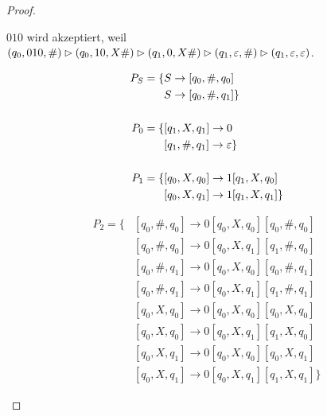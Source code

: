 \begin{proof}
\begin{center}
    \end{center}
    
    $010$ wird akzeptiert, weil
        $(q_0, 010, \#)\rhd (q_0, 10, X\#)\rhd (q_1, 0, X\#)\rhd (q_1, \varepsilon, \#)\rhd (q_1, \varepsilon, \varepsilon)$.
    
    \begin{center}
    \vspace*{-1.5\baselineskip}
    \begin{minipage}[t]{55mm}
    \begin{align*}
    P_S = \{ 
    & S \to [q_0, \#, q_0]\\
    & S \to [q_0, \#, q_1] 
    \}\\
    \\
    P_0 = \{ 
    & [q_1, X, q_1] \to 0\\
    & [q_1, \#, q_1] \to \varepsilon
    \}\\
    \\
    P_1 = \{ 
    & [q_0, X, q_0] \to 1[q_1, X, q_0]\\
    & [q_0, X, q_1] \to 1[q_1, X, q_1]
    \}
    \end{align*}
    \end{minipage}
    \begin{minipage}[t]{70mm}
    \begin{align*}
    P_2 = \{ 
    & [q_0, \#,q_0] \to 0[q_0, X, q_0] [q_0, \#, q_0]\\
    & [q_0, \#,q_0] \to 0[q_0, X, q_1] [q_1, \#, q_0]\\
    & [q_0, \#,q_1] \to 0[q_0, X, q_0] [q_0, \#, q_1]\\
    & [q_0, \#,q_1] \to 0[q_0, X, q_1] [q_1, \#, q_1]\\
    & [q_0, X,q_0] \to 0[q_0, X, q_0] [q_0, X, q_0]\\
    & [q_0, X,q_0] \to 0[q_0, X, q_1] [q_1, X, q_0]\\
    & [q_0, X,q_1] \to 0[q_0, X, q_0] [q_0, X, q_1]\\
    & [q_0, X,q_1] \to 0[q_0, X, q_1] [q_1, X, q_1]
    \}
    \end{align*}
    \end{minipage}
    \end{center}
    

\end{proof}

